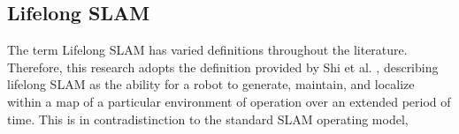 \subsection{Lifelong SLAM}

The term Lifelong SLAM has varied definitions throughout the literature. Therefore, this research adopts the definition provided by Shi et al. \cite{shiAreWeReady2020}, describing lifelong SLAM as the ability for a robot to generate, maintain, and localize within a map of a particular environment of operation over an extended period of time. This is in contradistinction to the standard SLAM operating model, 